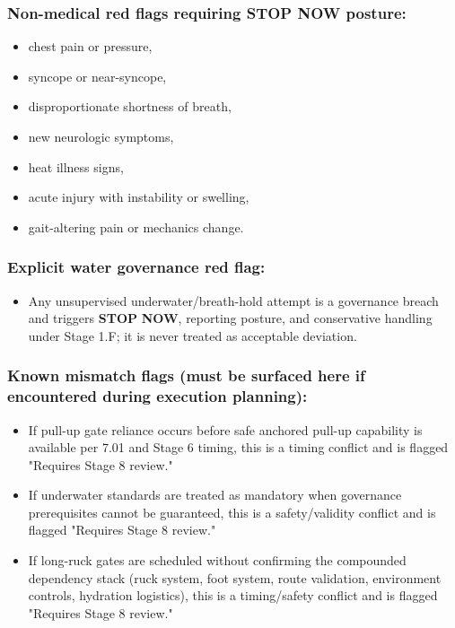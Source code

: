\documentclass[10pt]{article}
\begin{document}
\subsubsection*{Non-medical red flags requiring \textbf{STOP} \textbf{NOW} posture:}

\begin{itemize}
\item chest pain or pressure,
\item syncope or near-syncope,
\item disproportionate shortness of breath,
\item new neurologic symptoms,
\item heat illness signs,
\item acute injury with instability or swelling,
\item gait-altering pain or mechanics change.
\end{itemize}

\subsubsection*{Explicit water governance red flag:}

\begin{itemize}
\item Any unsupervised underwater/breath-hold attempt is a governance breach and triggers \textbf{STOP} \textbf{NOW}, reporting posture, and conservative handling under Stage 1.F; it is never treated as acceptable deviation.
\end{itemize}

\subsubsection*{Known mismatch flags (must be surfaced here if encountered during execution planning):}

\begin{itemize}
\item If pull-up gate reliance occurs before safe anchored pull-up capability is available per 7.01 and Stage 6 timing, this is a timing conflict and is flagged "Requires Stage 8 review."
\item If underwater standards are treated as mandatory when governance prerequisites cannot be guaranteed, this is a safety/validity conflict and is flagged "Requires Stage 8 review."
\item If long-ruck gates are scheduled without confirming the compounded dependency stack (ruck system, foot system, route validation, environment controls, hydration logistics), this is a timing/safety conflict and is flagged "Requires Stage 8 review."
\end{itemize}
\end{document}
